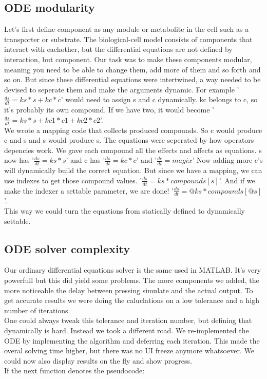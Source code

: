\documentclass[10pt,a4paper]{report}
\begin{document}
		\subsection{ODE modularity}
			Let's first define component as any module or metabolite in the cell such as a transporter or substrate. The biological-cell model consists of components that interact with eachother, but the differential equations are not defined by interaction, but component. Our task was to make these components modular, meaning you need to be able to change them, add more of them and so forth and so on. But since these differential equations were intertwined, a way needed to be devised to seperate them and make the arguments dynamic. For example '$\frac{ds}{dt} = ks * s + kc * c$' would need to assign s and c dynamically. kc belongs to c, so it's probably its own compound. If we have two, it would become '$\frac{ds}{dt} = ks * s + kc1 * c1 + kc2 * c2$'.\\
			We wrote a mapping code that collects produced compounds. So c would produce c and s and s would produce s. The equations were seperated by how operators depencies work. We gave each compound all the effects and affects as equations. s now has '$\frac{ds}{dt} = ks * s$' and c has '$\frac{ds}{dt} = kc * c$' and '$\frac{dc}{dt} = magix$' Now adding more c's will dynamically build the correct equation. But since we have a mapping, we can use indexes to get those compound values. '$\frac{ds}{dt} = ks * compounds[s]$'. And if we make the indexer a settable parameter, we are done! '$\frac{ds}{dt} = @ks * compounds[@s]$'. \\
			This way we could turn the equations from statically defined to dynamically settable.
			
		\subsection{ODE solver complexity}
			Our ordinary differential equations solver is the same used in MATLAB. It's very powerfull but this did yield some problems. The more components we added, the more noticeable the delay between pressing simulate and the actual output. To get accurate results we were doing the caluclations on a low tolerance and a high number of iterations. \\
			One could always tweak this tolerance and iteration number, but defining that dynamically is hard. Instead we took a different road. We re-implemented the ODE by implementing the algorithm and deferring each iteration. This made the overal solving time higher, but there was no UI freeze anymore whatsoever. We could now also display results on the fly and show progress.\\
			If the next function denotes the pseudocode:\\
\end{document}
